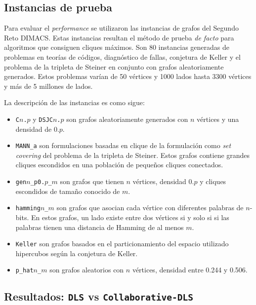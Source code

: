 \documentclass[conference]{IEEEtran}
\begin{document}
\subsection{Instancias de prueba}
\label{sec:instances}

Para evaluar el \emph{performance} se utilizaron las instancias de
grafos del Segundo Reto DIMACS. Estas instancias resultan el método de
prueba \emph{de facto} para algoritmos que consiguen cliques
máximos. Son 80 instancias generadas de problemas en teorías de
códigos, diagnóstico de fallas, conjetura de Keller y el problema de
la tripleta de Steiner en conjunto con grafos aleatoriamente
generados.  Estos problemas varían de 50 vértices y 1000 lados hasta
3300 vértices y más de 5 millones de lados.

La descripción de las instancias es como sigue:

\begin{itemize}
\item \texttt{C$n$.$p$} y \texttt{DSJC$n$.$p$} son grafos
  aleatoriamente generados con $n$ vértices y una densidad de $0.p$.

\item \texttt{MANN\_a} son formulaciones basadas en clique de la
  formulación como \emph{set covering} del problema de la tripleta de
  Steiner. Estos grafos contiene grandes cliques escondidos en una
  población de pequeños cliques conectados.

\item \texttt{gen$n$\_p0.$p$\_$m$} son grafos que tienen $n$ vértices,
  densidad $0.p$ y cliques escondidos de tamaño conocido de $m$.

\item \texttt{hamming$n$\_$m$} son grafos que asocian cada vértice con
  diferentes palabras de $n$-bits. En estos grafos, un lado existe
  entre dos vértices si y solo si si las palabras tienen una distancia
  de Hamming de al menos $m$.
\item \texttt{Keller} son grafos basados en el particionamiento del
  espacio utilizado hipercubos según la conjetura de Keller.
\item \texttt{p\_hat$n$\_$m$} son grafos aleatorios con $n$ vértices,
  densidad entre 0.244 y 0.506.

\end{itemize}

\subsection{Resultados: \texttt{DLS} vs \texttt{Collaborative-DLS}}
\label{sec:dls_res}
\end{document}
